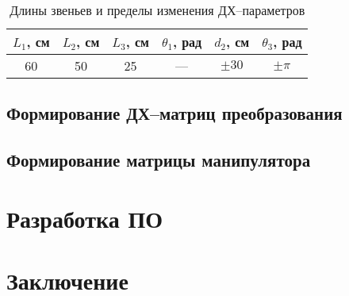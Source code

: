 \documentclass[oneside, final, 14pt]{extarticle}
\begin{document}
\begin{table}[h]
\centering
\begin{tabular}{|c|c|c|c|c|c|}
  \hline  \(L_1\), см & \(L_2\), см & \(L_3\), см & \(\theta_1\), рад & \(d_2\), см & \(\theta_3\), рад \\ \hline
  60 & 50 & 25 & --- & \(\pm 30\) & \(\pm \pi\) \\ \hline
\end{tabular}
\caption{Длины звеньев и пределы изменения ДХ--параметров}
\label{t:var-param}
\end{table}

\subsection{Формирование ДХ--матриц преобразования}

\subsection{Формирование матрицы манипулятора}

\newpage

\section{Разработка ПО}


\newpage

\section*{Заключение}


\newpage
\end{document}
